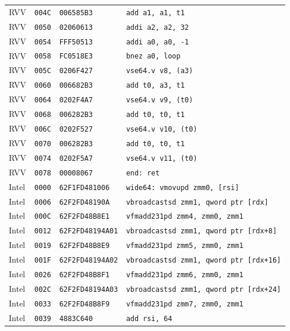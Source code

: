 \begin{table}[htbp]
\begin{tabular}{@{}l|l|l|p{7.2cm}@{}}
RVV & \texttt{004C} & \texttt{006585B3} & \texttt{add a1, a1, t1} \\
RVV & \texttt{0050} & \texttt{02060613} & \texttt{addi a2, a2, 32} \\
RVV & \texttt{0054} & \texttt{FFF50513} & \texttt{addi a0, a0, -1} \\
RVV & \texttt{0058} & \texttt{FC0518E3} & \texttt{bnez a0, loop} \\
RVV & \texttt{005C} & \texttt{0206F427} & \texttt{vse64.v v8, (a3)} \\
RVV & \texttt{0060} & \texttt{006682B3} & \texttt{add t0, a3, t1} \\
RVV & \texttt{0064} & \texttt{0202F4A7} & \texttt{vse64.v v9, (t0)} \\
RVV & \texttt{0068} & \texttt{006282B3} & \texttt{add t0, t0, t1} \\
RVV & \texttt{006C} & \texttt{0202F527} & \texttt{vse64.v v10, (t0)} \\
RVV & \texttt{0070} & \texttt{006282B3} & \texttt{add t0, t0, t1} \\
RVV & \texttt{0074} & \texttt{0202F5A7} & \texttt{vse64.v v11, (t0)} \\
RVV & \texttt{0078} & \texttt{00008067} & \texttt{end: ret} \\
\midrule
Intel & \texttt{0000} & \texttt{62F1FD481006} & \texttt{wide64: vmovupd zmm0, [rsi]} \\
Intel & \texttt{0006} & \texttt{62F2FD48190A} & \texttt{vbroadcastsd zmm1, qword ptr [rdx]} \\
Intel & \texttt{000C} & \texttt{62F2FD48B8E1} & \texttt{vfmadd231pd zmm4, zmm0, zmm1} \\
Intel & \texttt{0012} & \texttt{62F2FD48194A01} & \texttt{vbroadcastsd zmm1, qword ptr [rdx+8]} \\
Intel & \texttt{0019} & \texttt{62F2FD48B8E9} & \texttt{vfmadd231pd zmm5, zmm0, zmm1} \\
Intel & \texttt{001F} & \texttt{62F2FD48194A02} & \texttt{vbroadcastsd zmm1, qword ptr [rdx+16]} \\
Intel & \texttt{0026} & \texttt{62F2FD48B8F1} & \texttt{vfmadd231pd zmm6, zmm0, zmm1} \\
Intel & \texttt{002C} & \texttt{62F2FD48194A03} & \texttt{vbroadcastsd zmm1, qword ptr [rdx+24]} \\
Intel & \texttt{0033} & \texttt{62F2FD48B8F9} & \texttt{vfmadd231pd zmm7, zmm0, zmm1} \\
Intel & \texttt{0039} & \texttt{4883C640} & \texttt{add rsi, 64} \\

\end{tabular}
\end{table}

